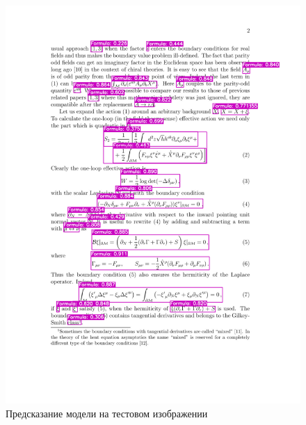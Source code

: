\begin{figure}
    \includegraphics[scale=0.75]{img/train/test_1.png}
    \caption{Предсказание модели на тестовом изображении}
    \label{train_test_1}
\end{figure}

